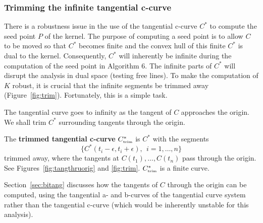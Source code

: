 \documentclass[12pt]{article}
\begin{document}

\subsubsection{Trimming the infinite tangential c-curve}
\label{sec:trim}

There is a robustness issue in the use of the tangential c-curve $C^*$
to compute the seed point $P$ of the kernel.
The purpose of computing a seed point is to allow $C$ to be moved
so that $C^*$ becomes finite and the convex hull of this finite $C^*$
is dual to the kernel.
Consequently, $C^*$ will inherently be infinite during the computation
of the seed point in Algorithm 6.
The infinite parts of $C^*$ will disrupt the analysis 
in dual space (testing free lines).
To make the computation of $K$ robust,
it is crucial that the infinite segments be trimmed away 
(Figure~\ref{fig:trim}).
Fortunately, this is a simple task.

The tangential curve goes to infinity as the tangent of $C$
approaches the origin.
We shall trim $C^*$ surrounding tangents through the origin.

\begin{defn2}
The {\bf trimmed tangential c-curve} $C^*_{\mbox{\tiny{trim}}}$
is $C^*$ with the segments
\[
\{C^*(t_i - \epsilon, t_i + \epsilon),\ \ i=1,\ldots,n\}
\]
trimmed away,
where the tangents at $C(t_1),\ldots,C(t_n)$ pass through the origin.
See Figures~\ref{fig:tangthruorig} and \ref{fig:trim}.
$C^*_{\mbox{\tiny{trim}}}$ is a finite curve.
\end{defn2}

Section~\ref{sec:bitang} discusses how the 
tangents of $C$ through the origin can be computed,
using the tangential a- and b-curves of the tangential
curve system rather than the tangential c-curve
(which would be inherently unstable for this analysis).

\end{document}
